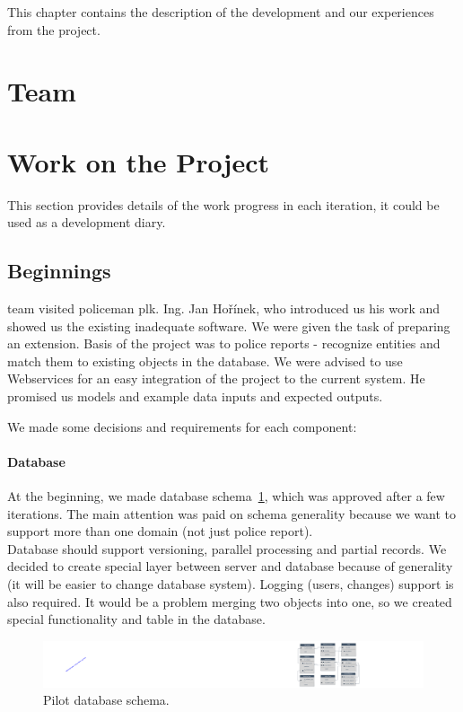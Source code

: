 This chapter contains the description of the development and our experiences from
the project.

\section{Team}

\section{Work on the Project}

This section provides details of the work progress in each iteration, it could be
used as a development diary.

\subsection{Beginnings}
\textan{} team visited policeman plk. Ing. Jan Hořínek, who introduced us his work and showed
us the existing inadequate software. We were given the task of preparing an extension.
Basis of the project was to police reports - recognize entities and match them
to existing objects in the database. We were advised to use Webservices for
an easy integration of the project to the current system. He promised us models
and example data inputs and expected outputs. 

We made some decisions and requirements for each component:

\paragraph{Database}
At the beginning, we made database schema~\ref{fig:dbpilot}, which was approved  after a few
iterations. The main attention was paid on schema generality because we want to
support more than one domain (not just police report).\\
Database should support versioning, parallel processing and partial records. We
decided to create special layer between server and database because of
generality (it will be easier to change database system). Logging (users,
changes) support is also required. It would be a problem merging two objects into 
one, so we created special functionality and table in the
database.
\begin{figure}[!htb]
        \centering
        \includegraphics[width=\textwidth]{Images/db-pilot}
        \caption{Pilot database schema.}
        \label{fig:dbpilot}
\end{figure}

